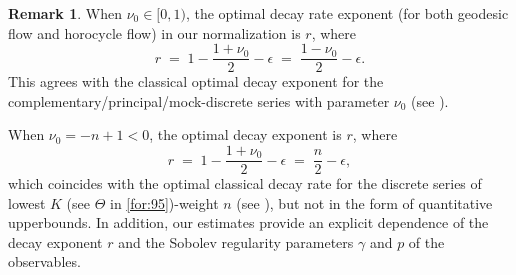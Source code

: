 \documentclass[11 pt]{amsart}
\theoremstyle{definition}
\newtheorem{remark}[theorem]{Remark}
\numberwithin{equation}{section}
\begin{document}
\begin{remark}\label{re:10}
When $\nu_0\in [0,1)$, the optimal decay rate exponent (for both geodesic flow and horocycle flow) in our normalization is $r$, where
\[
r \;=\; 1 - \frac{1+\nu_0}{2} - \epsilon \;=\; \frac{1-\nu_0}{2} - \epsilon.
\]
This agrees with the classical optimal decay exponent for the complementary/principal/mock-discrete series with parameter $\nu_0$ (see \cite{howe-moore}).

When $\nu_0 = -n+1<0$, the optimal decay exponent is $r$, where
\[
r \;=\; 1 - \frac{1+\nu_0}{2} - \epsilon \;=\; \frac{n}{2} - \epsilon,
\]
which coincides with the optimal classical decay rate for the discrete series of lowest $K$ (see $\Theta$ in \eqref{for:95})-weight $n$ (see \cite{Warner}), but not in the form of quantitative upperbounds. In addition, our estimates provide an explicit dependence of the decay exponent $r$ and the Sobolev regularity parameters $\gamma$ and $p$ of the observables.
\end{remark}
\end{document}
